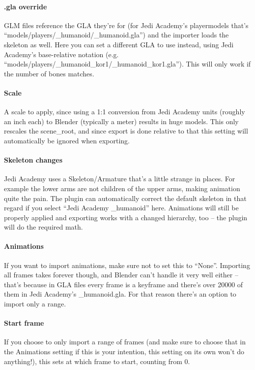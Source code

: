 \documentclass[a4paper,10pt]{article}
\begin{document}
 \paragraph*{.gla override}
 GLM files reference the GLA they're for (for Jedi Academy's playermodels that's
 ``models/players/\_humanoid/\_humanoid.gla'') and the importer loads the skeleton as well. Here you can set
 a different GLA to use instead, using Jedi Academy's base-relative notation (e.g.\\
 ``models/players/\_humanoid\_kor1/\_humanoid\_kor1.gla''). This will only work if the number of bones matches.
 
 \paragraph*{Scale}
 A scale to apply, since using a 1:1 conversion from Jedi Academy units (roughly an inch each) to Blender
 (typically a meter) results in huge models. This only rescales the scene\_root, and since export is done
 relative to that this setting will automatically be ignored when exporting.
 
 \paragraph*{Skeleton changes}
 Jedi Academy uses a Skeleton/Armature that's a little strange in places. For example the lower arms are not
 children of the upper arms, making animation quite the pain. The plugin can automatically correct the
 default skeleton in that regard if you select ``Jedi Academy \_humanoid'' here. Animations will still be
 properly applied and exporting works with a changed hierarchy, too -- the plugin will do the required math.
 
 \paragraph*{Animations}
 If you want to import animations, make sure not to set this to ``None''. Importing all frames takes forever
 though, and Blender can't handle it very well either -- that's because in GLA files every frame is a keyframe
 and there's over 20000 of them in Jedi Academy's \_humanoid.gla. For that reason there's an option to import
 only a range.
 
 \paragraph*{Start frame}
 If you choose to only import a range of frames (and make sure to choose that in the Animations setting if
 this is your intention, this setting on its own won't do anything!), this sets at which frame to start, 
 counting from 0.
 
\end{document}
